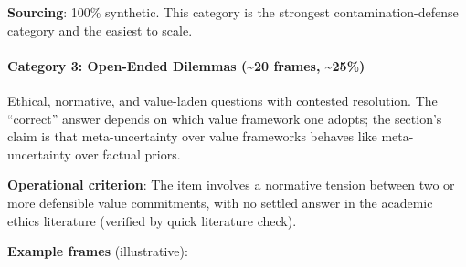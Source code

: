 \documentclass{article}
\begin{document}
\textbf{Sourcing}: 100\% synthetic. This category is the strongest
contamination-defense category and the easiest to scale.

\paragraph{Category 3: Open-Ended Dilemmas (\textasciitilde20 frames,
\textasciitilde25\%)}\label{category-3-open-ended-dilemmas-20-frames-25}

Ethical, normative, and value-laden questions with contested resolution.
The ``correct'' answer depends on which value framework one adopts; the
section's claim is that meta-uncertainty over value frameworks behaves
like meta-uncertainty over factual priors.

\textbf{Operational criterion}: The item involves a normative tension
between two or more defensible value commitments, with no settled answer
in the academic ethics literature (verified by quick literature check).

\textbf{Example frames} (illustrative):
\end{document}
